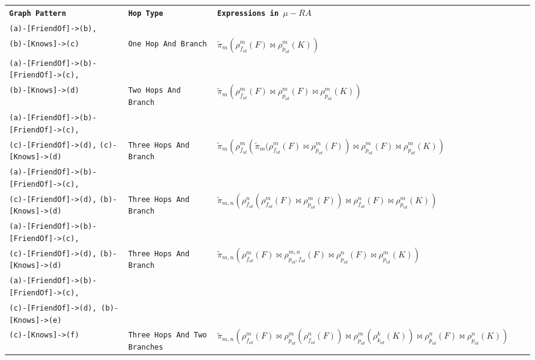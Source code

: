 \documentclass{beamer}
\newcommand{\rename}[3]{\rho_{#1}^{#2}\left(#3\right)}
\newcommand{\drop}[2]{\widetilde{\pi}_{#1}\left(#2\right)}
\newcommand{\NJoin}{\bowtie}
\begin{document}
\begin{frame}

    \begin{table}[h]
      \resizebox{1.1\textwidth}{!}
      {%
      \begin{tabular}{lllll}
      \cline{1-3}
       \textbf{\texttt{Graph Pattern}} & \textbf{\texttt{Hop Type}}  & \textbf{\texttt{Expressions in $\mu-RA$}} &  &  \\ \cline{1-3}
       \texttt{(a)-[FriendOf]->(b),} \\ \texttt{(b)-[Knows]->(c)}& \texttt{One Hop And Branch} & $ \drop{m}{\rename {f_{id}} m F \NJoin \rename {p_{id}} m K} $ &  &  \\ \cline{1-3}
       \texttt{(a)-[FriendOf]->(b)-[FriendOf]->(c),} \\ \texttt{(b)-[Knows]->(d)}& \texttt{Two Hops And Branch} & $\drop{m}{\rename {f_{id}} m F \NJoin \rename {p_{id}} m F  \NJoin \rename {p_{id}} m K}$ &  &  \\ \cline{1-3}
       \texttt{(a)-[FriendOf]->(b)-[FriendOf]->(c),} \\ \texttt{(c)-[FriendOf]->(d),}  \texttt{(c)-[Knows]->(d)}& \texttt{Three Hops And Branch} & $ \drop{m}{\rename{f_{id}}{m}{\widetilde\pi_{m}(\rename {f_{id}} m F \NJoin \rename {p_{id}} m F} \NJoin \rename{p_{id}}{m}{F} \NJoin \rename{p_{id}}{m}{K}} $ &  &  \\ \cline{1-3}
       \texttt{(a)-[FriendOf]->(b)-[FriendOf]->(c),} \\ \texttt{(c)-[FriendOf]->(d),}  \texttt{(b)-[Knows]->(d)}& \texttt{Three Hops And Branch} & $ \drop{m,n}{\rename{f_{id}}{n}{\rename{f_{id}}{m}{F} \NJoin \rename{p_{id}}{m}{F}} \NJoin \rename{f_{id}}{n}{F} \NJoin \rename{p_{id}}{m}{K}} $ &  &  \\ \cline{1-3}
       \texttt{(a)-[FriendOf]->(b)-[FriendOf]->(c),} \\ \texttt{(c)-[FriendOf]->(d),}  \texttt{(b)-[Knows]->(d)}& \texttt{Three Hops And Branch} & $ \drop{m,n}{\rename{f_{id}}{m}{F} \NJoin \rename{p_{id}, f_{id}}{m,n}{F}   \NJoin \rename{p_{id}}{n}{F} \NJoin \rename{p_{id}}{m}{K}} $ &  &  \\ \cline{1-3}
       \texttt{(a)-[FriendOf]->(b)-[FriendOf]->(c),} \\ \texttt{(c)-[FriendOf]->(d), (b)-[Knows]->(e)} \\ \texttt{(c)-[Knows]->(f)} & \texttt{Three Hops And Two Branches} & $ \drop{m,n}{\rename{f_{id}}{m}{F} \NJoin \rename{p_{id}}{m}{\rename{f_{id}}{n}{F}} \NJoin \rename{p_{id}}{m}{\rename{k_{id}}{k}{K}} \NJoin \rename{p_{id}}{n}{F} \NJoin \rename{p_{id}}{n}{K}} $ && \\ \cline{1-3}
      \end{tabular}%
      }
      \end{table}
    

\end{frame}
\end{document}

